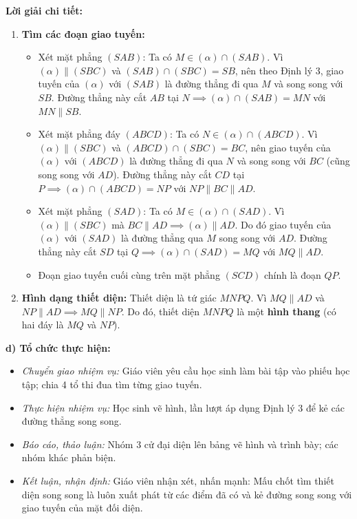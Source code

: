 \documentclass[12pt, a4paper]{article}
\begin{document}
\textbf{Lời giải chi tiết:}
\begin{enumerate}[leftmargin=0.6cm]
    \item \textbf{Tìm các đoạn giao tuyến:}
    \begin{itemize}
        \item Xét mặt phẳng $(SAB)$: Ta có $M \in (\alpha) \cap (SAB)$. Vì $(\alpha) \parallel (SBC)$ và $(SAB) \cap (SBC) = SB$, nên theo Định lý 3, giao tuyến của $(\alpha)$ với $(SAB)$ là đường thẳng đi qua $M$ và song song với $SB$. Đường thẳng này cắt $AB$ tại $N \implies (\alpha) \cap (SAB) = MN$ với $MN \parallel SB$.
        \item Xét mặt phẳng đáy $(ABCD)$: Ta có $N \in (\alpha) \cap (ABCD)$. Vì $(\alpha) \parallel (SBC)$ và $(ABCD) \cap (SBC) = BC$, nên giao tuyến của $(\alpha)$ với $(ABCD)$ là đường thẳng đi qua $N$ và song song với $BC$ (cũng song song với $AD$). Đường thẳng này cắt $CD$ tại $P \implies (\alpha) \cap (ABCD) = NP$ với $NP \parallel BC \parallel AD$.
        \item Xét mặt phẳng $(SAD)$: Ta có $M \in (\alpha) \cap (SAD)$. Vì $(\alpha) \parallel (SBC)$ mà $BC \parallel AD \implies (\alpha) \parallel AD$. Do đó giao tuyến của $(\alpha)$ với $(SAD)$ là đường thẳng qua $M$ song song với $AD$. Đường thẳng này cắt $SD$ tại $Q \implies (\alpha) \cap (SAD) = MQ$ với $MQ \parallel AD$.
        \item Đoạn giao tuyến cuối cùng trên mặt phẳng $(SCD)$ chính là đoạn $QP$.
    \end{itemize}

    \item \textbf{Hình dạng thiết diện:}
    Thiết diện là tứ giác $MNPQ$.
    Vì $MQ \parallel AD$ và $NP \parallel AD \implies MQ \parallel NP$.
    Do đó, thiết diện $MNPQ$ là một \textbf{hình thang} (có hai đáy là $MQ$ và $NP$).
\end{enumerate}

\noindent \textbf{d) Tổ chức thực hiện:}
\begin{itemize}[leftmargin=0.8cm]
    \item \textit{Chuyển giao nhiệm vụ:} Giáo viên yêu cầu học sinh làm bài tập vào phiếu học tập; chia 4 tổ thi đua tìm từng giao tuyến.
    \item \textit{Thực hiện nhiệm vụ:} Học sinh vẽ hình, lần lượt áp dụng Định lý 3 để kẻ các đường thẳng song song.
    \item \textit{Báo cáo, thảo luận:} Nhóm 3 cử đại diện lên bảng vẽ hình và trình bày; các nhóm khác phản biện.
    \item \textit{Kết luận, nhận định:} Giáo viên nhận xét, nhấn mạnh: Mấu chốt tìm thiết diện song song là luôn xuất phát từ các điểm đã có và kẻ đường song song với giao tuyến của mặt đối diện.
\end{itemize}
\end{document}
